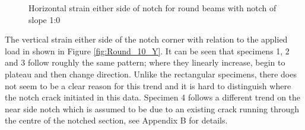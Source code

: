 \documentclass[11pt,a4paper]{article}
\numberwithin{equation}{subsection}
\begin{document}
\vspace*{\baselineskip}
\begin{figure}[h]
	\begin{center}
	\end{center}
	\caption{Horizontal strain either side of notch for round beams with notch of slope 1:0}
	\label{fig:Round_10_Z}
\end{figure}
\pagebreak

\noindent
The vertical strain either side of the notch corner with relation to the applied load in shown in Figure \ref{fig:Round_10_Y}. It can be seen that specimens 1, 2 and 3 follow roughly the same pattern; where they linearly increase, begin to plateau and then change direction. Unlike the rectangular specimens, there does not seem to be a clear reason for this trend and it is hard to distinguish where the notch crack initiated in this data. Specimen 4 follows a different trend on the near side notch which is assumed to be due to an existing crack running through the centre of the notched section, see Appendix B for details. 
\end{document}
